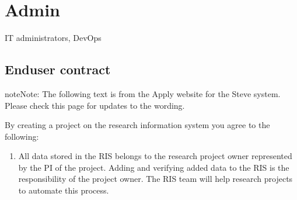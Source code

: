 \documentclass[letterpaper,10pt,english]{sphinxmanual}
\begin{document}
\sphinxstepscope


\chapter{Admin}
\label{\detokenize{ServerAdmin/index:admin}}\label{\detokenize{ServerAdmin/index::doc}}
\sphinxAtStartPar
{} IT administrators, DevOps

\sphinxstepscope


\section{End\sphinxhyphen{}user contract}
\label{\detokenize{ServerAdmin/admin:end-user-contract}}\label{\detokenize{ServerAdmin/admin::doc}}
\begin{sphinxadmonition}{note}{Note:}
\sphinxAtStartPar
The following text is from the Apply website for the Steve system. Please check this page for updates to the wording.
\end{sphinxadmonition}

\sphinxAtStartPar
By creating a project on the research information system you agree to the following:
\begin{enumerate}
%
\item {} 
\sphinxAtStartPar
All data stored in the RIS belongs to the research project owner represented by the PI of the project. Adding and verifying added data to the RIS is the responsibility of the project owner. The RIS team will help research projects to automate this process.

\end{enumerate}
\end{document}

